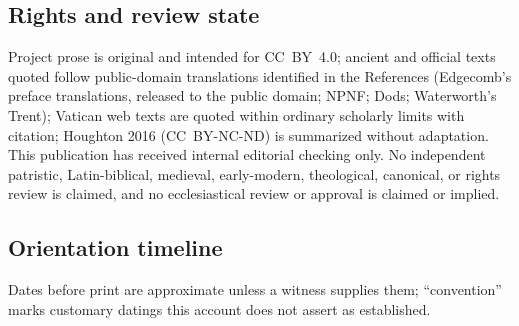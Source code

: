 \subsection{Rights and review state}

Project prose is original and intended for CC~BY~4.0; ancient and
official texts quoted follow public-domain translations identified in
the References (Edgecomb's preface translations, released to the public
domain; NPNF; Dods; Waterworth's Trent); Vatican web texts are quoted
within ordinary scholarly limits with citation; Houghton 2016
(CC~BY-NC-ND) is summarized without adaptation. This publication has
received internal editorial checking only. No independent patristic,
Latin-biblical, medieval, early-modern, theological, canonical, or
rights review is claimed, and no ecclesiastical review or approval is
claimed or implied.

\subsection{Orientation timeline}

Dates before print are approximate unless a witness supplies them;
``convention'' marks customary datings this account does not assert as
established.

